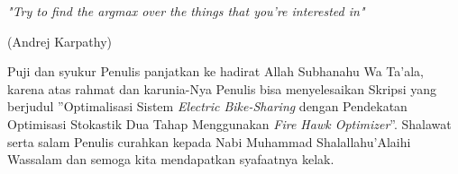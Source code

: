 \documentclass{skripsimathugm}
\begin{document}
\cover\titlepage
\approvalpage
\declarepage


\acknowledment
\begin{flushright}
\Large\emph{}
\end{flushright}


\motto
\emph{"\textit{Try to find the argmax over the things that you're interested in}"}
\begin{flushright}
(Andrej Karpathy)
\end{flushright}


\preface
Puji dan syukur Penulis panjatkan ke hadirat Allah Subhanahu Wa Ta’ala, karena atas rahmat dan karunia-Nya Penulis bisa menyelesaikan Skripsi yang berjudul ”Optimalisasi Sistem \textit{Electric Bike-Sharing} dengan Pendekatan Optimisasi Stokastik Dua Tahap Menggunakan \textit{Fire Hawk Optimizer}”. Shalawat serta salam Penulis curahkan kepada Nabi Muhammad Shalallahu’Alaihi Wassalam dan semoga kita mendapatkan syafaatnya kelak.
\end{document}
